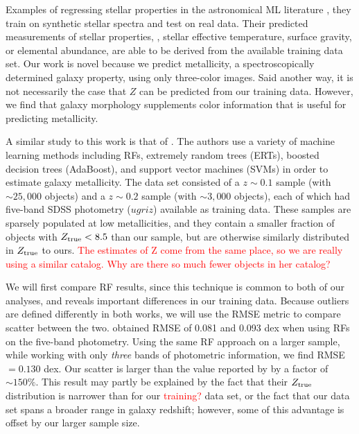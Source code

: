 \documentclass[fleqn,usenatbib]{mnras}
\newcommand{\editorial}[1]{\textcolor{red}{#1}}
\begin{document}
Examples of regressing stellar properties in the astronomical ML literature , they train on synthetic stellar spectra and test on real data. Their predicted measurements of stellar properties, \eg, stellar effective temperature, surface gravity, or elemental abundance, are able to be derived from the available training data set. Our work is novel because we predict metallicity, a spectroscopically determined galaxy property, using only three-color images. Said another way, it is not necessarily the case that $Z$ can be predicted from our training data. However, we find that galaxy morphology supplements color information that is useful for predicting metallicity.

A similar study to this work is that of \cite{Acquaviva2016}. The authors use a variety of machine learning methods including RFs, extremely random trees (ERTs), boosted decision trees (AdaBoost), and support vector machines (SVMs) in order to estimate galaxy metallicity. The \cite{Acquaviva2016} data set consisted of a $z \sim 0.1$ sample (with $\sim 25,000$ objects) and a $z \sim 0.2$ sample (with $\sim 3,000$ objects), each of which had five-band SDSS photometry ($ugriz$) available as training data. These samples are sparsely populated at low metallicities, and they contain a smaller fraction of objects with $Z_{\rm true} < 8.5$ than our sample, but are otherwise similarly distributed in $Z_{\rm true}$ to ours. \editorial{The estimates of Z come from the same place, so we are really using a similar catalog. Why are there so much fewer objects in her catalog?}

We will first compare RF results, since this technique is common to both of our analyses, and reveals important differences in our training data. Because outliers are defined differently in both works, we will use the RMSE metric to compare scatter between the two. \cite{Acquaviva2016} obtained RMSE of 0.081 and 0.093 dex when using RFs on the five-band photometry. Using the same RF approach on a larger sample, while working with only \textit{three} bands of photometric information, we find RMSE $= 0.130$ dex. Our scatter is larger than the value reported by \cite{Acquaviva2016} by a factor of $\sim 150\%$. This result may partly be explained by the fact that their $Z_{\rm true}$ distribution is narrower than for our \editorial{training?} data set, or the fact that our data set spans a broader range in galaxy redshift; however, some of this advantage is offset by our larger sample size.
\end{document}
